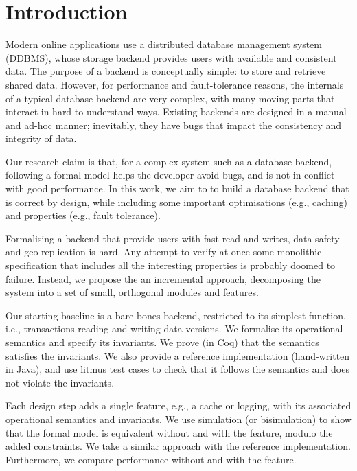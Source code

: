 \documentclass[systeme,french,english]{compas2022}
\begin{document}

\section{Introduction}

Modern online applications use a distributed database management system
(DDBMS), whose storage backend provides users with available and
consistent data.
The purpose of a backend is conceptually simple: to store and retrieve
shared data.
However, for performance and fault-tolerance reasons, the internals of a
typical database backend are very complex, with many moving parts that interact
in hard-to-understand ways.
Existing backends are designed in a manual and ad-hoc manner;
inevitably, they have bugs that impact the consistency and integrity of
data.

Our research claim is that, for a complex system such as a database
backend, following a formal model helps the developer avoid bugs, and is
not in conflict with good performance.
In this work, we aim to to build a database backend that is correct by
design, while including some important optimisations (e.g., caching) and
properties (e.g., fault tolerance).

Formalising a backend that provide users with fast read and writes,
data safety and geo-replication is hard.
Any attempt to verify at once some monolithic specification that
includes all the interesting properties is probably doomed to failure.
Instead, we propose the an incremental approach,  decomposing the
system into a set of small, orthogonal modules and features.

Our starting baseline is a bare-bones backend, restricted to its
simplest function, i.e., transactions reading and writing data versions.
We formalise its operational semantics and specify its invariants.
We prove (in Coq) that the semantics satisfies the invariants.
We also provide a reference implementation (hand-written in Java), and
use litmus test cases to check that it follows the semantics and does
not violate the invariants.

Each design step adds a single feature, e.g., a cache or logging,
with its associated operational semantics and invariants.
We use simulation (or bisimulation) to show that the formal model is
equivalent without and with the feature, modulo the added constraints.
We take a similar approach with the reference implementation.
Furthermore, we compare performance without and with the feature.
\end{document}

